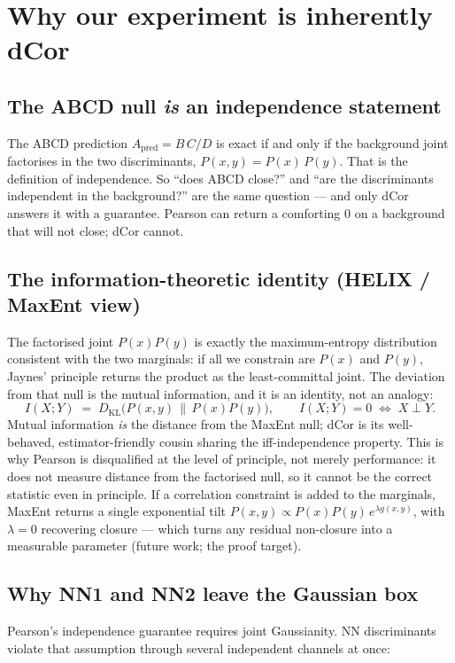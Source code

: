\documentclass[11pt]{article}
\newcommand{\KL}{D_{\mathrm{KL}}}
\begin{document}
\section{Why our experiment is inherently dCor}

\subsection*{The ABCD null \emph{is} an independence statement}
The ABCD prediction $A_{\text{pred}} = B\,C/D$ is exact if and only if the
background joint factorises in the two discriminants,
$P(x,y)=P(x)\,P(y)$. That is the definition of independence. So ``does ABCD
close?'' and ``are the discriminants independent in the background?'' are the
same question --- and only dCor answers it with a guarantee. Pearson can return
a comforting $0$ on a background that will not close; dCor cannot.

\subsection*{The information-theoretic identity (HELIX / MaxEnt view)}
The factorised joint $P(x)P(y)$ is exactly the maximum-entropy distribution
consistent with the two marginals: if all we constrain are $P(x)$ and $P(y)$,
Jaynes' principle returns the product as the least-committal joint. The deviation
from that null is the mutual information, and it is an identity, not an analogy:
\begin{equation}
I(X;Y) \;=\; \KL\!\big(P(x,y)\,\|\,P(x)P(y)\big),
\qquad I(X;Y)=0 \;\Longleftrightarrow\; X\perp Y .
\end{equation}
Mutual information \emph{is} the distance from the MaxEnt null; dCor is its
well-behaved, estimator-friendly cousin sharing the iff-independence property.
This is why Pearson is disqualified at the level of principle, not merely
performance: it does not measure distance from the factorised null, so it cannot
be the correct statistic even in principle. If a correlation constraint is added
to the marginals, MaxEnt returns a single exponential tilt
$P(x,y)\propto P(x)P(y)\,e^{\lambda g(x,y)}$, with $\lambda=0$ recovering
closure --- which turns any residual non-closure into a measurable parameter
(future work; the proof target).

\subsection*{Why NN1 and NN2 leave the Gaussian box}
Pearson's independence guarantee requires joint Gaussianity. NN discriminants
violate that assumption through several independent channels at once:
\end{document}
